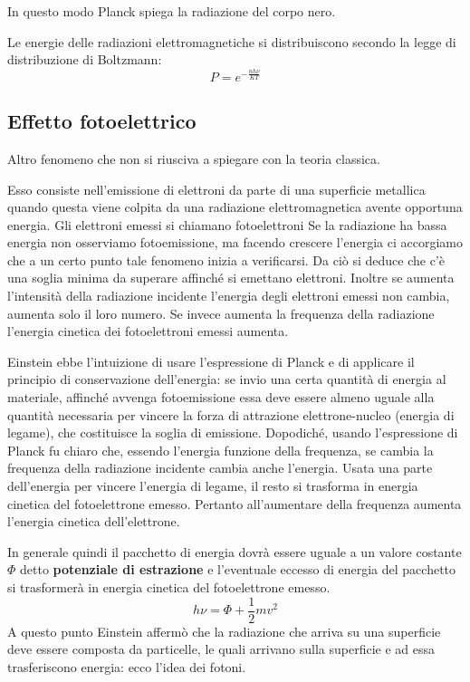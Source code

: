 In questo modo Planck spiega la radiazione del corpo nero.

Le energie delle radiazioni elettromagnetiche si distribuiscono secondo la legge di distribuzione di Boltzmann:
$$P=e^{{-\frac{nh\nu}{KT}}}$$%
\subsection{Effetto fotoelettrico}
Altro fenomeno che non si riusciva a spiegare con la teoria classica.

Esso consiste nell'emissione di elettroni da parte di una superficie metallica quando questa viene colpita da una radiazione elettromagnetica avente opportuna energia. Gli elettroni emessi si chiamano fotoelettroni
Se la radiazione ha bassa energia non osserviamo fotoemissione, ma facendo crescere l'energia ci accorgiamo che a un certo punto tale fenomeno inizia a verificarsi. Da ciò si deduce che c'è una soglia minima da superare affinché si emettano elettroni. Inoltre se aumenta l'intensità della radiazione incidente l'energia degli elettroni emessi non cambia, aumenta solo il loro numero. Se invece aumenta la frequenza della radiazione l'energia cinetica dei fotoelettroni emessi aumenta.

Einstein ebbe l'intuizione di usare l'espressione di Planck e di applicare il principio di conservazione dell'energia: se invio una certa quantità di energia al materiale, affinché avvenga fotoemissione essa deve essere almeno uguale alla quantità necessaria per vincere la forza di attrazione elettrone-nucleo (energia di legame), che costituisce la soglia di emissione. Dopodiché, usando l'espressione di Planck fu chiaro che, essendo l'energia funzione della frequenza, se cambia la frequenza della radiazione incidente cambia anche l'energia. Usata una parte dell'energia per vincere l'energia di legame, il resto si trasforma in energia cinetica del fotoelettrone emesso.
Pertanto all'aumentare della frequenza aumenta l'energia cinetica dell'elettrone.

In generale quindi il pacchetto di energia dovrà essere uguale a un valore costante $\Phi$ detto \textbf{potenziale di estrazione} e l'eventuale eccesso di energia del pacchetto si trasformerà in energia cinetica del fotoelettrone emesso.
$$h\nu=\Phi+\frac{1}{2}mv^2$$
A questo punto Einstein affermò che la radiazione che arriva su una superficie deve essere composta da particelle, le quali arrivano sulla superficie e ad essa trasferiscono energia: ecco l'idea dei fotoni.


